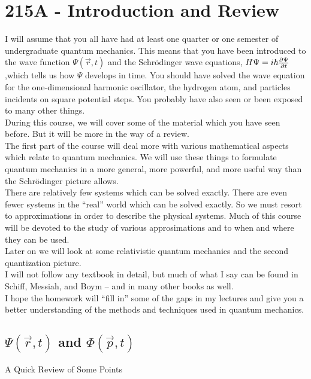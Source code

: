 \section{215A - Introduction and Review}

I will assume that you all have had at least one quarter or one semester of undergraduate quantum mechanics.
This means that you have been introduced to the wave function $\Psi(\vec r,t)$ and the Schr\"odinger wave equations, 
$H\Psi = i\hbar {\partial \Psi\over \partial t}$,which tells us how $\Psi$ develops in time. You should have solved the wave
equation for the one-dimensional harmonic oscillator, the hydrogen atom, and particles incidents on square potential steps.
You probably have also seen or been exposed to many other things.\\

During this course, we will cover some of the material which you have seen before. But it will be more in the way of a review.\\

The first part of the course will deal more with various mathematical aspects which relate to quantum mechanics. We will use these things to 
formulate quantum mechanics in a more general, more powerful, and more useful way than the Schr\"odinger picture allows.\\

There are relatively few systems which can be solved exactly. There are even fewer systems in the ``real'' world which can 
be solved exactly. So we must resort to approximations in order to describe the physical systems. Much of this course will 
be devoted to the study of various approsimations and to when and where they can be used. \\

Later on we will look at some relativistic quantum mechanics and the second quantization picture.\\ 

I will not follow any textbook in detail, but much of what I say can be found in Schiff, Messiah, and Boym -- and in many other books as well.\\

I hope the homework will ``fill in'' some of the gaps in my lectures and give you a better understanding of the methods and techniques used
in quantum mechanics.
 
\subsection{$\Psi(\vec{r},t)$  and $\Phi(\vec{p},t)$ }
 \centerline{A Quick Review of Some Points}
  
